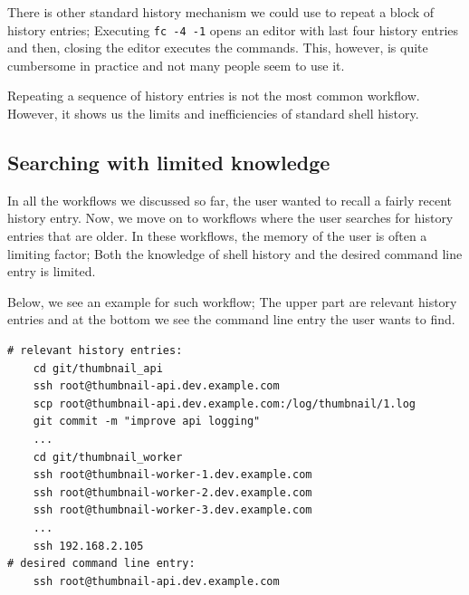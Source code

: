\documentclass[thesis=M,english]{FITthesis}[2012/10/20]
\newcommand{\redtext}[1]{\textcolor{red}{[[#1]]}}
\begin{document}
There is other standard history mechanism we could use to repeat a block of history entries; 
Executing \verb|fc -4 -1| opens an editor with last four history entries and then, closing the editor executes the commands. This, however, is quite cumbersome in practice and not many people seem to use it. 


Repeating a sequence of history entries is not the most common workflow. However, it shows us the limits and inefficiencies of standard shell history.


\subsection{Searching with limited knowledge}\label{workflow-search-w-limited-knowledge}

In all the workflows we discussed so far, the user wanted to recall a fairly recent history entry. Now, we move on to workflows where the user searches for history entries that are older. In these workflows, the memory of the user is often a limiting factor; Both the knowledge of shell history and the desired command line entry is limited.

Below, we see an example for such workflow; The upper part are relevant history entries and at the bottom we see the command line entry the user wants to find. 



        

\begin{verbatim}
# relevant history entries:
    cd git/thumbnail_api
    ssh root@thumbnail-api.dev.example.com
    scp root@thumbnail-api.dev.example.com:/log/thumbnail/1.log
    git commit -m "improve api logging"
    ...
    cd git/thumbnail_worker
    ssh root@thumbnail-worker-1.dev.example.com
    ssh root@thumbnail-worker-2.dev.example.com
    ssh root@thumbnail-worker-3.dev.example.com
    ...
    ssh 192.168.2.105
# desired command line entry:
    ssh root@thumbnail-api.dev.example.com
\end{verbatim}
\end{document}
